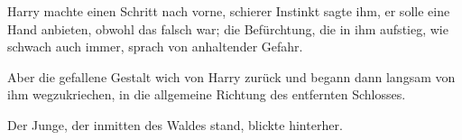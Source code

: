 Harry machte einen Schritt nach vorne, schierer Instinkt sagte ihm, er solle eine Hand anbieten, obwohl das falsch war; die Befürchtung, die in ihm aufstieg, wie schwach auch immer, sprach von anhaltender Gefahr.

Aber die gefallene Gestalt wich von Harry zurück und begann dann langsam von ihm wegzukriechen, in die allgemeine Richtung des entfernten Schlosses.

Der Junge, der inmitten des Waldes stand, blickte hinterher.

